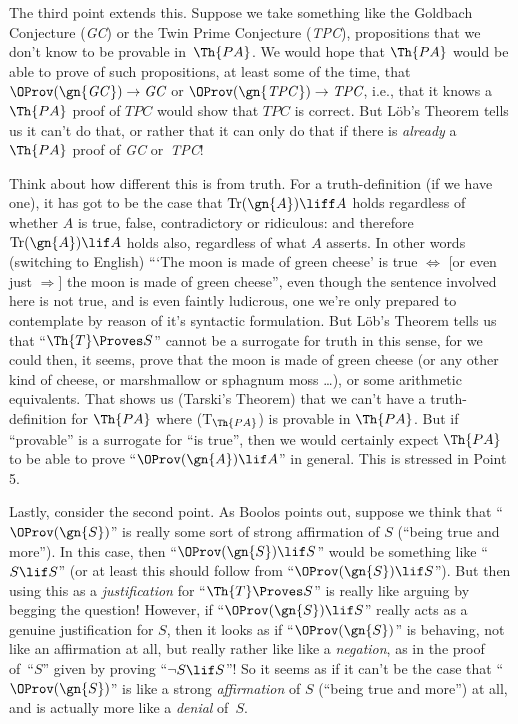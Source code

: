 The third point extends this. Suppose we take something like the
Goldbach Conjecture (\textit{GC\/}) or the Twin Prime Conjecture
(\textit{TPC\/}), propositions that we don't know to be provable
in~$\Th{PA}$. We would hope that $\Th{PA}$ would be able to prove of
such propositions, at least some of the time, that
$\OProv(\gn{\textit{GC\/}}) \to \textit{GC}$ or
$\OProv(\gn{\textit{TPC\/}}) \to \textit{TPC}$, i.e., that it knows a
$\Th{PA}$ proof of $\textit{TPC}$ would show that $\textit{TPC}$ is
correct. But L\"ob's Theorem tells us it can't do that, or rather that
it can only do that if there is \emph{already} a $\Th{PA}$ proof of
\textit{GC} or~\textit{TPC}!{}

Think about how different this is from truth. For a truth-definition
(if we have one), it has got to be the case that $\mathrm{Tr}(\gn{A})
\liff A$ holds regardless of whether $A$ is true, false, contradictory
or ridiculous: and therefore $\mathrm{Tr}(\gn{A}) \lif A$ holds  also,
regardless of what $A$ asserts. In other words (switching to English)
``{}`The moon is made of green cheese' is true $\Leftrightarrow$ [or
even just $\Rightarrow$]  the moon is made of green cheese'', even
though the sentence involved here is not true, and is even faintly
ludicrous, one we're only prepared to contemplate by reason of it's
syntactic formulation.  But L\"ob's Theorem tells us that ``$\Th{T}
\Proves S$'' cannot be a surrogate for truth in this sense, for we
could then, it seems,  prove that the moon is made of green cheese (or
any other kind of cheese, or marshmallow or sphagnum moss \dots), or
some arithmetic equivalents. That shows us (Tarski's Theorem) that we
can't have a truth-definition for $\Th{PA}$ where (T$_{\Th{PA}}$) is
provable in $\Th{PA}$. But if ``provable'' is a surrogate for ``is
true'', then we would certainly expect $\Th{PA}$ to be able to
prove ``$\OProv(\gn{A}) \lif A$'' in general. This is stressed in
Point 5.

Lastly, consider the second point. As Boolos points out, suppose we
think that ``$\OProv(\gn{S})$'' is really some sort of strong
affirmation of $S$ (``being true and more''). In this case, then
``$\OProv(\gn{S}) \lif S$'' would be  something like ``$S \lif S$''
(or at least this should follow from ``$\OProv(\gn{S}) \lif S$'').
But then using this as a \emph{justification} for ``$\Th{T}\Proves S$''
is really like arguing by begging the question!{} However,  if
``$\OProv(\gn{S}) \lif S$'' really acts as a genuine justification
for $S$,  then it looks as if ``$\OProv(\gn{S})$'' is behaving,
not like an affirmation at all, but really rather like like a
\emph{negation}, as in the proof of~``$S$'' given by proving ``$\lnot S
\lif S$''!{} So it seems as if it can't be the case that
``$\OProv(\gn{S})$'' is like a strong \emph{affirmation} of $S$
(``being true and more'') at all, and is actually more like a
\emph{denial} of~$S$.
